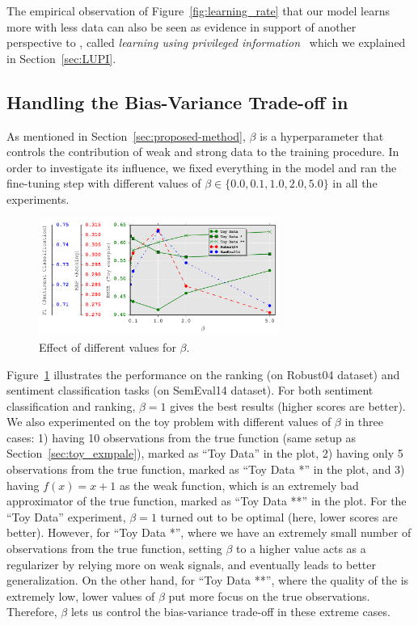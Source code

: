 The empirical observation of Figure~\ref{fig:learning_rate} that our model learns more with less data can also be seen as evidence in support of another perspective to \fwl, called \emph{learning using privileged information}~\citep{vapnik2015learning} which we explained in Section~\ref{sec:LUPI}. 



\subsection{Handling the Bias-Variance Trade-off in \fwl}
\label{sec:bias-variance}
As mentioned in Section~\ref{sec:proposed-method}, $\beta$ is a hyperparameter that controls the contribution of weak and strong data to the training procedure. In order to investigate its influence, we fixed everything in the model and ran the fine-tuning step with different values of $\beta \in \{0.0, 0.1, 1.0, 2.0, 5.0\}$ in all the experiments.

%
\begin{figure}[t]
    \centering
    \includegraphics[width=0.7\textwidth]{03-part-02/chapter-05/figs_and_tables/plot_beta_fwl.png}
    \caption{Effect of different values for $\beta$.}
    \label{fig:beta}
\end{figure}

Figure~\ref{fig:beta} illustrates the performance on the ranking (on Robust04 dataset) and sentiment classification tasks (on SemEval14 dataset).  For both sentiment classification and ranking, $\beta=1$ gives the best results (higher scores are better).
%
We also experimented on the toy problem with different values of $\beta$ in three cases: 
1) having 10 observations from the true function (same setup as Section~\ref{sec:toy_exmpale}), marked as ``Toy Data'' in the plot, 
2) having only 5 observations from the true function, marked as ``Toy Data *'' in the plot, and 
3) having $f(x) = x + 1$ as the weak function, which is an extremely bad approximator of the true function, marked as ``Toy Data **'' in the plot.
%
For the ``Toy Data'' experiment, $\beta=1$ turned out to be optimal (here, lower scores are better). However, for ``Toy Data *'', where we have an extremely small number of observations from the true function, setting $\beta$ to a higher value acts as a regularizer by relying more on weak signals, and eventually leads to better generalization. 
On the other hand, for ``Toy Data **'', where the quality of the \wa is extremely low, lower values of $\beta$ put more focus on the true observations. Therefore, $\beta$ lets us control the bias-variance trade-off in these extreme cases.

